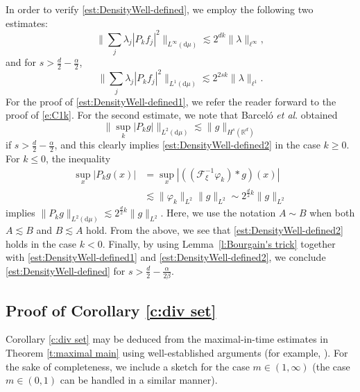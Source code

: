 \documentclass[a4paper]{amsart}
\numberwithin{equation}{section}%
\theoremstyle{plain}%
\theoremstyle{definition}
\theoremstyle{remark}%
\def\d{\mathrm{d}}
\newcommand{\R}{{\mathbb R}}
\newcommand{\F}{\mathcal{F}}
\begin{document}
In order to verify \eqref{est:DensityWell-defined}, we employ the following two estimates:
\begin{equation}
\label{est:DensityWell-defined1}
    \bigg\| \sum_{j} \lambda_j | P_k f_j |^2 \bigg\|_{L^{\infty}(\d \mu)} \lesssim 2^{dk} \|\lambda \|_{\ell^{\infty}},
\end{equation}
and for $s>\frac{d}{2}- \frac{\alpha}{2}$, 
\begin{equation}
\label{est:DensityWell-defined2}
    \bigg\| \sum_{j} \lambda_j | P_k f_j |^2 \bigg\|_{L^{1}(\d \mu)} \lesssim 2^{2 s k} \|\lambda \|_{\ell^{1}}.
\end{equation}
For the proof of \eqref{est:DensityWell-defined1}, we refer the reader forward to the proof of \eqref{e:C1k}. 
For the second estimate, we note that Barcel\'o \emph{et al}. \cite[Appendix A]{BBCR} obtained 
\[
\bigl\| \sup_k |P_k g| \bigr\|_{L^2(\d \mu)} \lesssim \| g \|_{H^s(\R^d)}
\]
if $s >\frac{d}{2} - \frac{\alpha}{2}$, and this clearly implies \eqref{est:DensityWell-defined2} in the case $k\geq 0$. 
For $k \leq 0$, the inequality 
\begin{align*}
\sup_{x}|P_k g(x)| &
= \sup_{x} |((\F_{\xi}^{-1} \varphi_k) * g)(x)| \\
& \lesssim \|\varphi_k\|_{L^2} \|g\|_{L^2} \sim 2^{\frac{d}{2}k} \|g\|_{L^2}
\end{align*}
implies $\|P_k g\|_{L^2(\mathrm{d}\mu)} \lesssim 2^{\frac{d}{2}k} \|g\|_{L^2}$. Here, we use the notation $A \sim B$ when both $A \lesssim B$ and $B \lesssim A$ hold. From the above, we see that \eqref{est:DensityWell-defined2} holds in the case $k< 0$. 
Finally, by using Lemma~\ref{l:Bourgain's trick} together with \eqref{est:DensityWell-defined1} and \eqref{est:DensityWell-defined2}, we conclude \eqref{est:DensityWell-defined} for $s > \frac{d}{2} - \frac{\alpha}{2 \beta}$. 




\subsection{Proof of Corollary \ref{c:div set}}
Corollary \ref{c:div set} may be deduced from the maximal-in-time estimates in Theorem \ref{t:maximal main} using well-established arguments (for example, \cite{BBCR, CL}). For the sake of completeness, we include a sketch for the case $m \in (1,\infty)$ (the case $m \in (0,1)$ can be handled in a similar manner).
\end{document}
